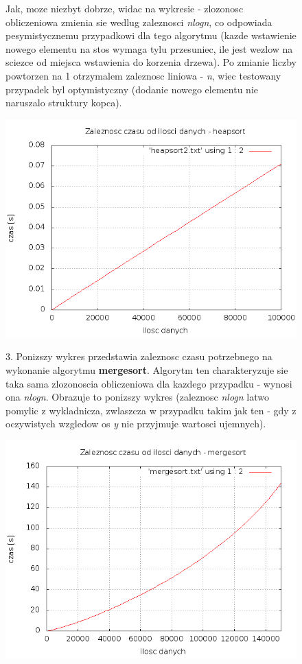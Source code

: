 \documentclass[a4paper,11pt]{report}
\begin{document}
\begin{figure}
    Jak, moze niezbyt dobrze, widac na wykresie - zlozonosc obliczeniowa zmienia sie wedlug zaleznosci \emph{nlogn}, co odpowiada pesymistycznemu przypadkowi dla tego algorytmu (kazde wstawienie nowego elementu na stos wymaga tylu przesuniec, ile jest wezlow na sciezce od miejsca wstawienia do korzenia drzewa). Po zmianie liczby powtorzen na 1 otrzymalem zaleznosc liniowa - \emph{n}, wiec testowany przypadek byl optymistyczny (dodanie nowego elementu nie naruszalo struktury kopca).
     \begin{center}\includegraphics[scale=0.55]{./heapsort2.png}\end{center}
\end{figure}

\begin{figure}
  3. Ponizszy wykres przedstawia zaleznosc czasu potrzebnego na wykonanie algorytmu \textbf{mergesort}. Algorytm ten charakteryzuje sie taka sama zlozonoscia obliczeniowa dla kazdego przypadku - wynosi ona \emph{nlogn}. Obrazuje to ponizszy wykres (zaleznosc \emph{nlogn} latwo pomylic z wykladnicza, zwlaszcza w przypadku takim jak ten - gdy z oczywistych wzgledow os \emph{y} nie przyjmuje wartosci ujemnych).
   \begin{center} \includegraphics[scale=0.55]{./mergesort.png}\end{center}
\end{figure}
\end{document}
